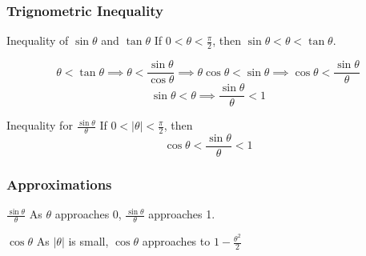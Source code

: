     \begin{frame}
    \frametitle{Trignometric Inequality}
    \begin{block}{Inequality of \(\sin \theta\) and \(\tan \theta\)}
        If \( 0 < \theta < \frac{\pi}{2} \), then \(\sin \theta < \theta < \tan \theta \).
    \end{block}
    \begin{displaymath}
        \theta < \tan \theta \implies \theta < \frac{\sin \theta}{\cos \theta} \implies \theta \cos \theta < \sin \theta \implies \cos \theta < \frac{\sin \theta}{\theta}
    \end{displaymath}
    \begin{displaymath}
        \sin \theta < \theta \implies \frac{\sin \theta}{\theta} < 1
    \end{displaymath}
    \begin{block}{Inequality for \( \frac{\sin \theta}{\theta} \)}
        If \( 0 < |\theta| < \frac{\pi}{2} \), then
        \[ \cos \theta <  \frac{\sin \theta}{\theta} < 1 \]
    \end{block}
    \end{frame}

    \begin{frame}
        \frametitle{Approximations}
        \begin{block}{\( \frac{\sin \theta}{\theta} \)}
            As \( \theta \) approaches 0, \( \frac{\sin \theta}{\theta} \) approaches 1.
        \end{block}
        \begin{block}{\(  \cos \theta \)}
            As \( |\theta| \) is small, \( \cos \theta \) approaches to  \(1 - \frac{\theta^2}{2} \)

        \end{block}


    \end{frame}
